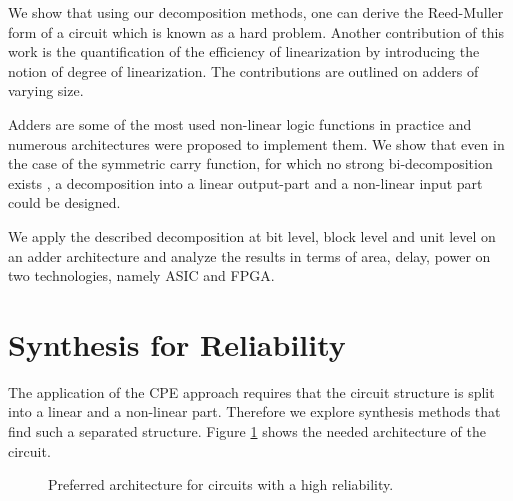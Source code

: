 \documentclass[a4paper]{article}
\newcommand\bx{\mathbf{x}}
\begin{document}
We show that using our decomposition methods, one can derive the Reed-Muller form of a circuit which is known as a hard problem.
\cite{Knysh11}
Another contribution of this work is the quantification of the efficiency of linearization by introducing the notion of degree of linearization. The contributions are outlined on adders of varying size.

Adders are some of the most used non-linear logic functions in practice and numerous architectures were proposed to implement them. We show that even in the case of the symmetric carry function, for which no strong bi-decomposition exists \cite{BDS_NDM_MCD_EDAC_1991,MSP_ABD_LF_DAC_2001}, a decomposition into a linear output-part and a non-linear input part could be designed.

We apply the described decomposition at bit level, block level and unit level on an adder architecture and analyze the results in terms of area, delay, power on two technologies, namely ASIC and FPGA.

\section{Synthesis for Reliability}


The application of the CPE approach requires that the circuit structure is split into a linear and a non-linear part. Therefore we explore synthesis methods that find such a separated structure. Figure \ref{fig:dec_arch} shows the needed architecture of the circuit.

\begin{figure}
	\centering
{}		
	\caption{Preferred architecture for circuits with a high reliability.}
	\label{fig:dec_arch}
\end{figure}
\end{document}
